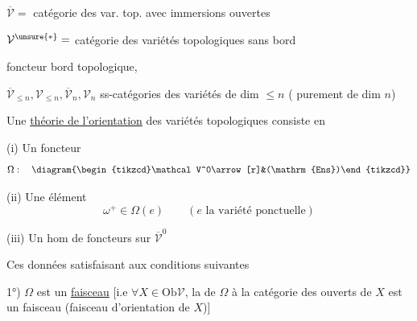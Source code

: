 $\overline{\mathcal V}=$ catégorie des var. top.  avec immersions ouvertes

$\mathcal V^{\unsure{*}}=$ catégorie des variétés topologiques sans bord

 foncteur bord topologique,

$\overline{\mathcal V}_{\le n},\mathcal V_{\le n},\overline{\mathcal V}_n,\mathcal V_n$ ss-catégories des variétés de dim $\le n$ ( purement de dim $n$)

Une \uline{théorie de l'orientation} des variétés topologiques consiste en

(i) Un foncteur
\[
\Omega:\quad\diagram{\begin{tikzcd}\mathcal V^0\arrow[r]&(\mathrm{Ens})\end{tikzcd}}
\]

(ii) Une  élément 
\[
\omega^+\in\Omega(e)\qquad(e\text{ la variété ponctuelle})
\]

(iii)  Un hom de foncteurs sur $\overline{\mathcal V}^{0}$

Ces données satisfaisant aux conditions suivantes

1°) $\Omega$ est un \uline{faisceau} [i.e $\forall X\in\mathrm{Ob}\mathcal V$, la   de $\Omega$ à la catégorie des ouverts de $X$ est un faisceau (faisceau d'orientation de $X$)]

